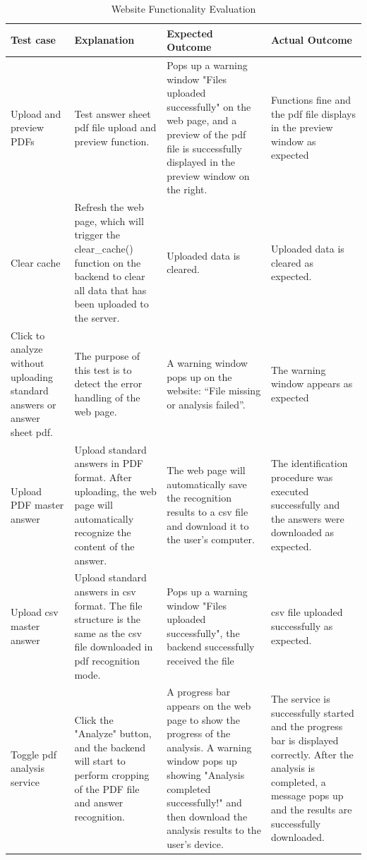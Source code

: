 \documentclass[twocolumn]{article}
\begin{document}
    \begin{table}[htbp]
        \centering
        \caption{Website Functionality Evaluation}
        \label{tab:website_functionality}
        \begin{tabularx}{\textwidth}{|X|X|X|X|}
        \hline
        Test case & Explanation & Expected Outcome & Actual Outcome \\ \hline
        Upload and preview PDFs & Test answer sheet pdf file upload and preview function. & Pops up a warning window "Files uploaded successfully"  on the web page, and a preview of the pdf file is successfully displayed in the preview window on the right. & Functions fine and the pdf file displays in the preview window as expected \\ \hline
        Clear cache & Refresh the web page, which will trigger the clear\_cache() function on the backend to clear all data that has been uploaded to the server. & Uploaded data is cleared. & Uploaded data is cleared as expected. \\ \hline
        Click to analyze without uploading standard answers or answer sheet pdf. & The purpose of this test is to detect the error handling of the web page. & A warning window pops up on the website: “File missing or analysis failed”. & The warning window appears as expected \\ \hline
        Upload PDF master answer& Upload standard answers in PDF format. After uploading, the web page will automatically recognize the content of the answer. & The web page will automatically save the recognition results to a csv file and download it to the user's computer. & The identification procedure was executed successfully and the answers were downloaded as expected. \\ \hline
        Upload csv master answer & Upload standard answers in csv format. The file structure is the same as the csv file downloaded in pdf recognition mode. & Pops up a warning window "Files uploaded successfully", the backend successfully received the file & csv file uploaded successfully as expected. \\ \hline
        Toggle pdf analysis service & Click the "Analyze" button, and the backend will start to perform cropping of the PDF file and answer recognition. & A progress bar appears on the web page to show the progress of the analysis. A warning window pops up showing "Analysis completed successfully!" and then download the analysis results to the user's device. & The service is successfully started and the progress bar is displayed correctly. After the analysis is completed, a message pops up and the results are successfully downloaded. \\ \hline

\end{tabularx}
\end{table}
\end{document}
